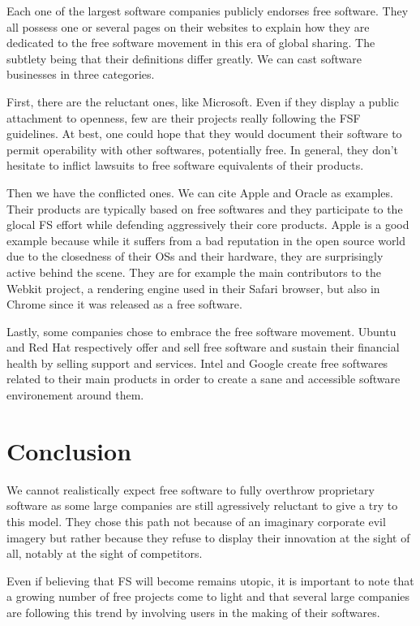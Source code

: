 \documentclass[12pt]{article}
\begin{document}
Each one of the largest software companies publicly endorses free
software. They all possess one or several pages on their websites to
explain how they are dedicated to the free software movement in this
era of global sharing. The subtlety being that their definitions
differ greatly. We can cast software businesses in three categories.

First, there are the reluctant ones, like Microsoft. Even if they
display a public attachment to openness, few are their projects really
following the FSF guidelines. At best, one could hope that they would
document their software to permit operability with other softwares,
potentially free. In general, they don't hesitate to inflict lawsuits
to free software equivalents of their products.

Then we have the conflicted ones. We can cite Apple and Oracle as
examples. Their products are typically based on free softwares and
they participate to the glocal FS effort while defending aggressively
their core products. Apple is a good example because while it suffers
from a bad reputation in the open source world due to the closedness
of their OSs and their hardware, they are surprisingly active behind the scene. They are for example the
main contributors to the Webkit project, a rendering engine used in their Safari browser, but also in Chrome since it was released
as a free software.

Lastly, some companies chose to embrace the free software
movement. Ubuntu and Red Hat respectively offer and sell free software
and sustain their financial health by selling support and
services. Intel and Google create free softwares related to their main
products in order to create a sane and accessible software
environement around them.

\section*{Conclusion}

We cannot realistically expect free software to fully overthrow proprietary software
as some large companies are still agressively reluctant to give a try to this model.
They chose this path not because of an imaginary corporate evil imagery but rather because
they refuse to display their innovation at the sight of all, notably at the sight of competitors.

Even if believing that FS will become remains utopic, it is important to note
that a growing number of free projects come to light and that several large companies
are following this trend by involving users in the making of their softwares.
\end{document}
